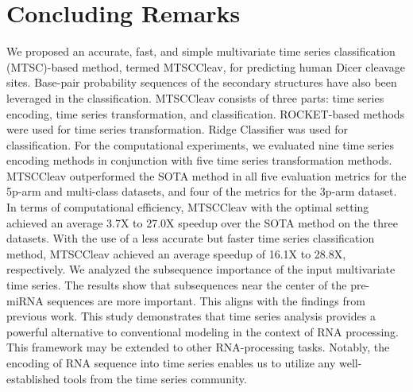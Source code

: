 \section{Concluding Remarks} \label{sec:conclusion}
We proposed an accurate, fast, and simple multivariate time series classification (MTSC)-based method, termed MTSCCleav, for predicting human Dicer cleavage sites.
Base-pair probability sequences of the secondary structures have also been leveraged in the classification.
MTSCCleav consists of three parts: time series encoding, time series transformation, and classification.
ROCKET-based methods were used for time series transformation.
Ridge Classifier was used for classification.
For the computational experiments, we evaluated nine time series encoding methods in conjunction with five time series transformation methods.
MTSCCleav outperformed the SOTA method in all five evaluation metrics for the 5p-arm and multi-class datasets, and four of the metrics for the 3p-arm dataset.
In terms of computational efficiency, MTSCCleav with the optimal setting achieved an average 3.7X to 27.0X speedup over the SOTA method on the three datasets.
With the use of a less accurate but faster time series classification method, MTSCCleav achieved an average speedup of 16.1X to 28.8X, respectively.
We analyzed the subsequence importance of the input multivariate time series.
The results show that subsequences near the center of the pre-miRNA sequences are more important.
This aligns with the findings from previous work.
This study demonstrates that time series analysis provides a powerful alternative to conventional modeling in the context of RNA processing. 
This framework may be extended to other RNA-processing tasks.
Notably, the encoding of RNA sequence into time series enables us to utilize any well-established tools from the time series community. 

